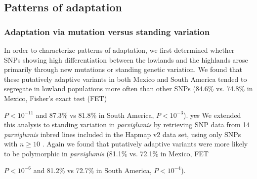 \subsection*{Patterns of adaptation}

\subsubsection{Adaptation via mutation versus standing variation}

In order to characterize patterns of adaptation, we first determined whether  SNPs showing high differentiation between the lowlands and the highlands arose primarily through new mutations or standing genetic variation.  
We found that these putatively adaptive variants in both Mexico and South America tended to segregate in lowland populations more often than other SNPs (84.6\% vs. 74.8\% in Mexico, Fisher's exact test (FET) {$P < 10^{-11}$ and 87.3\% vs 81.8\% in South America,  $P< 10^{-3}$).  
\st{yes}
We extended this analysis to standing variation in \emph{parviglumis} by retrieving SNP data from 14 \emph{parviglumis} inbred lines included in the Hapmap v2 data set, using only SNPs with $n\geq10$ \cite[]{Chia_2012_22660545,Hufford_2012_22660546}.  
Again we found that putatively adaptive variants were more likely to be polymorphic in \emph{parviglumis} (81.1\% vs. 72.1\% in Mexico, FET {$P < 10^{-6}$ and 81.2\% vs 72.7\% in South America,  $P< 10^{-4}$).  


}}

